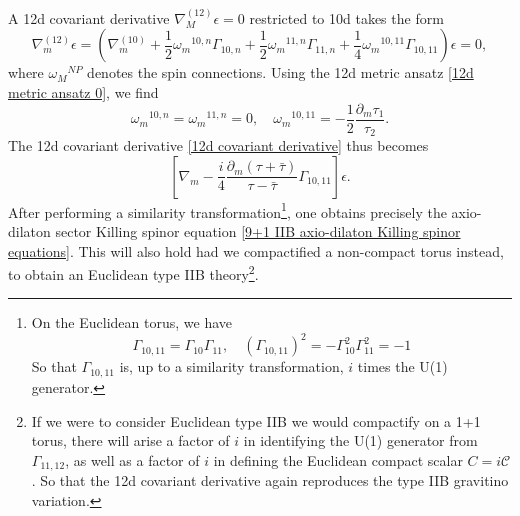 A 12d covariant derivative $\nabla^{(12)}_M\epsilon = 0$ restricted to 10d takes the form
\begin{equation}
\nabla^{(12)}_m\epsilon
=\left(
\nabla^{(10)}_m
+\frac{1}{2}\omega_m{}^{10,n}\Gamma_{10,n}
+\frac{1}{2}\omega_m{}^{11,n}\Gamma_{11,n}
+\frac{1}{4}\omega_m{}^{10,11}\Gamma_{10,11}\right)\epsilon = 0,
\label{12d covariant derivative}
\end{equation}
where $\omega_{M}{}^{NP}$ denotes the spin connections.
Using the 12d metric ansatz \eqref{12d metric ansatz 0}, we find
\begin{equation}
\omega_m{}^{10,n}=\omega_m{}^{11,n}=0,\quad
\omega_m{}^{10,11} = -\frac{1}{2}\frac{\partial_m \tau_1}{\tau_2}.
\end{equation}
The 12d covariant derivative \eqref{12d covariant derivative} thus becomes
\begin{equation}
\left[
\nabla_m -\frac{i}{4}\frac{\partial_m(\tau+\bar\tau)}{\tau-\bar\tau}\Gamma_{10,11}
\right]\epsilon.
\end{equation}
After performing a similarity transformation\footnote{
On the Euclidean torus, we have
\begin{equation}
\Gamma_{10,11} = \Gamma_{10}\Gamma_{11},\quad
(\Gamma_{10,11})^2 
=-\Gamma_{10}^2\Gamma_{11}^2 = -1
\end{equation}
So that $\Gamma_{10,11}$ is, up to a similarity transformation, $i$ times the U(1) generator.
},
one obtains precisely the axio-dilaton sector Killing spinor equation \eqref{9+1 IIB axio-dilaton Killing spinor equations}.
This will also hold had we compactified a non-compact torus instead, to obtain an Euclidean type IIB theory\footnote{
If we were to consider Euclidean type IIB we would compactify on a 1+1 torus, there will arise a factor of $i$ in identifying the U(1) generator from $\Gamma_{11,12}$, as well as a factor of $i$ in defining the Euclidean compact scalar $C = i\mathcal C$. 
So that the 12d covariant derivative again reproduces the type IIB gravitino variation.
}.
